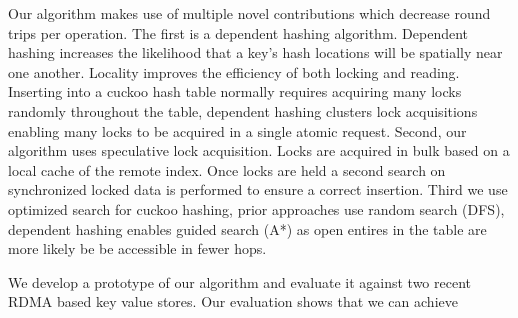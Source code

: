 Our algorithm makes use of multiple novel contributions
which decrease round trips per operation. The first is a
dependent hashing algorithm. Dependent hashing increases the
likelihood that a key's hash locations will be spatially
near one another. Locality improves the efficiency of both
locking and reading. Inserting into a cuckoo hash table
normally requires acquiring many locks randomly throughout
the table, dependent hashing clusters lock acquisitions
enabling many locks to be acquired in a single atomic
request. Second, our algorithm uses speculative lock
acquisition. Locks are acquired in bulk based on a local
cache of the remote index. Once locks are held a second
search on synchronized locked data is performed to ensure a
correct insertion. Third we use optimized search for cuckoo
hashing, prior approaches use random search (DFS), dependent
hashing enables guided search (A*) as open entires in the
table are more likely be be accessible in fewer hops.


We develop a prototype of our algorithm and evaluate it
against two recent RDMA based key value stores. Our
evaluation shows that we can achieve ~